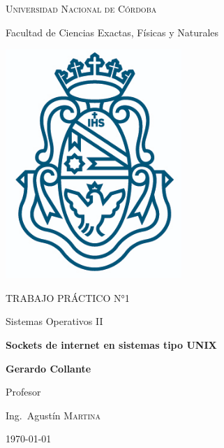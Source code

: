 \documentclass[14.5pt,a4paper]{article}
\begin{document}
\begin{titlepage}
	
	{\scshape\LARGE Universidad Nacional de Córdoba \par}
	{\Large Facultad de Ciencias Exactas, Físicas y Naturales \par}
	\vspace{0.5cm}
	\centering
	\includegraphics[width=0.5\textwidth]{unc.png}
	\par\vspace{0.5cm}
	\vspace{0.5cm}
	{\scshape\Large TRABAJO PRÁCTICO N°1\par}
	{\large Sistemas Operativos II\par}
	\vspace{1.5cm}
	{\large\bfseries Sockets de internet en sistemas tipo UNIX \par}
	\vspace{1.5cm}
	{\Large\bfseries Gerardo Collante\par}
	\vfill
	Profesor\par
	Ing.~Agustín \textsc{Martina}

	\vfill

	{\large \today\par}
\end{titlepage}

\end{document}
